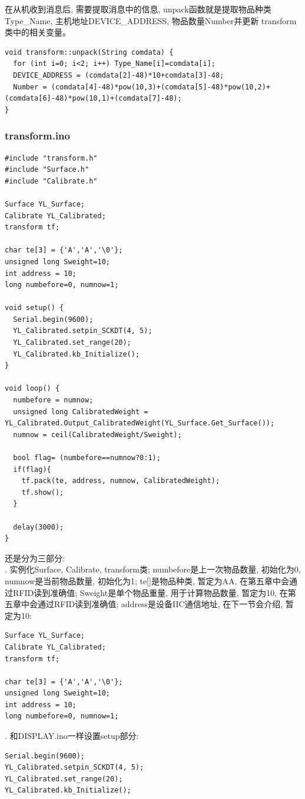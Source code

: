 \documentclass{article}
\begin{document}
在从机收到消息后, 需要提取消息中的信息, unpack函数就是提取物品种类Type\_Name, 主机地址DEVICE\_ADDRESS, 物品数量Number并更新
transform类中的相关变量。
\begin{lstlisting}
void transform::unpack(String comdata) {
  for (int i=0; i<2; i++) Type_Name[i]=comdata[i];
  DEVICE_ADDRESS = (comdata[2]-48)*10+comdata[3]-48;
  Number = (comdata[4]-48)*pow(10,3)+(comdata[5]-48)*pow(10,2)+(comdata[6]-48)*pow(10,1)+(comdata[7]-48);
}  
\end{lstlisting}

\subsubsection{transform.ino}
\begin{lstlisting}
#include "transform.h"
#include "Surface.h"
#include "Calibrate.h"

Surface YL_Surface;
Calibrate YL_Calibrated;
transform tf;

char te[3] = {'A','A','\0'}; 
unsigned long Sweight=10;
int address = 10;
long numbefore=0, numnow=1;

void setup() {
  Serial.begin(9600);
  YL_Calibrated.setpin_SCKDT(4, 5);
  YL_Calibrated.set_range(20);
  YL_Calibrated.kb_Initialize();
}

void loop() {
  numbefore = numnow;
  unsigned long CalibratedWeight = YL_Calibrated.Output_CalibratedWeight(YL_Surface.Get_Surface());
  numnow = ceil(CalibratedWeight/Sweight);

  bool flag= (numbefore==numnow?0:1);
  if(flag){
    tf.pack(te, address, numnow, CalibratedWeight);
    tf.show();
  }

  delay(3000);
}
\end{lstlisting}

还是分为三部分:\\
. 实例化Surface, Calibrate, transform类; numbefore是上一次物品数量, 初始化为0, numnow是当前物品数量, 初始化为1; 
te[]是物品种类, 暂定为AA, 在第五章中会通过RFID读到准确值; Sweight是单个物品重量,
用于计算物品数量, 暂定为10, 在第五章中会通过RFID读到准确值; address是设备IIC通信地址, 在下一节会介绍, 暂定为10:
\begin{lstlisting}
Surface YL_Surface;
Calibrate YL_Calibrated;
transform tf;

char te[3] = {'A','A','\0'}; 
unsigned long Sweight=10;
int address = 10;
long numbefore=0, numnow=1;  
\end{lstlisting}

. 和DISPLAY.ino一样设置setup部分:
\begin{lstlisting}
Serial.begin(9600);
YL_Calibrated.setpin_SCKDT(4, 5);
YL_Calibrated.set_range(20);
YL_Calibrated.kb_Initialize(); 
\end{lstlisting}
\end{document}
